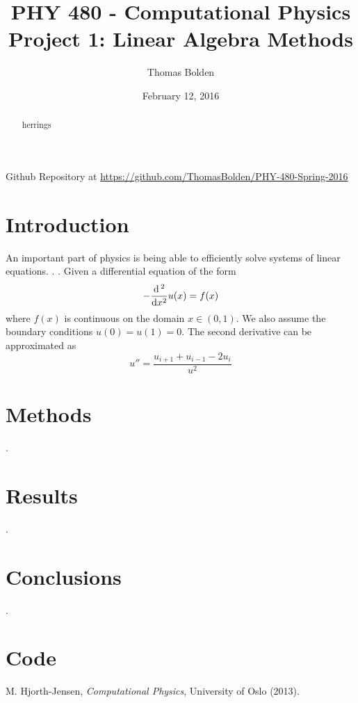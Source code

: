 \documentclass[11pt]{article}
\title{PHY 480 - Computational Physics \\ Project 1: Linear Algebra Methods}
\author{Thomas Bolden}
\date{February 12, 2016}
\begin{document}
\maketitle

\centerline{Github Repository at \href{https://github.com/ThomasBolden/PHY-480-Spring-2016}{https://github.com/ThomasBolden/PHY-480-Spring-2016}}

\begin{abstract}

    herrings

\end{abstract}

\vspace{\fill}
\tableofcontents

\pagebreak

\section{Introduction}

    An important part of physics is being able to efficiently solve systems of linear equations. . . Given a differential equation of the form 
    \begin{equation} - \dfrac{\dif\,^2}{\dif x^2} u(x) = f(x) \end{equation}
    where $f(x)$ is continuous on the domain $x \in (0,1)$. We also assume the boundary conditions $u(0)=u(1)=0$. The second derivative can be approximated as 
    \begin{equation} u'' = \dfrac{u_{i+1}+u_{i-1}-2u_i}{u^2} \end{equation}

\section{Methods}

    .

\section{Results}

    .

\section{Conclusions}

    .

\section{Code}

    

\begin{thebibliography}{1}

     M. Hjorth-Jensen, {\em Computational Physics}, University of Oslo (2013).

\end{thebibliography}
\end{document}

